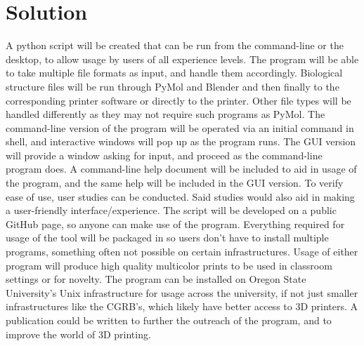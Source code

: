 \documentclass[onecolumn, draftclsnofoot,10pt, compsoc]{IEEEtran}
\begin{document}
\section{Solution}
A python script will be created that can be run from the command-line or the desktop, to allow usage by users of all experience levels.
The program will be able to take multiple file formats as input, and handle them accordingly.
Biological structure files will be run through PyMol and Blender and then finally to the corresponding printer software or directly to the printer.
Other file types will be handled differently as they may not require such programs as PyMol.
The command-line version of the program will be operated via an initial command in shell, and interactive windows will pop up as the program runs.
The GUI version will provide a window asking for input, and proceed as the command-line program does.
A command-line help document will be included to aid in usage of the program, and the same help will be included in the GUI version.
To verify ease of use, user studies can be conducted.
Said studies would also aid in making a user-friendly interface/experience.
The script will be developed on a public GitHub page, so anyone can make use of the program.
Everything required for usage of the tool will be packaged in so users don’t have to install multiple programs, something often not possible on certain infrastructures.
Usage of either program will produce high quality multicolor prints to be used in classroom settings or for novelty. 
The program can be installed on Oregon State University’s Unix infrastructure for usage across the university, if not just smaller infrastructures like the CGRB’s, which likely have better access to 3D printers.
A publication could be written to further the outreach of the program, and to improve the world of 3D printing.
 
\end{document}
